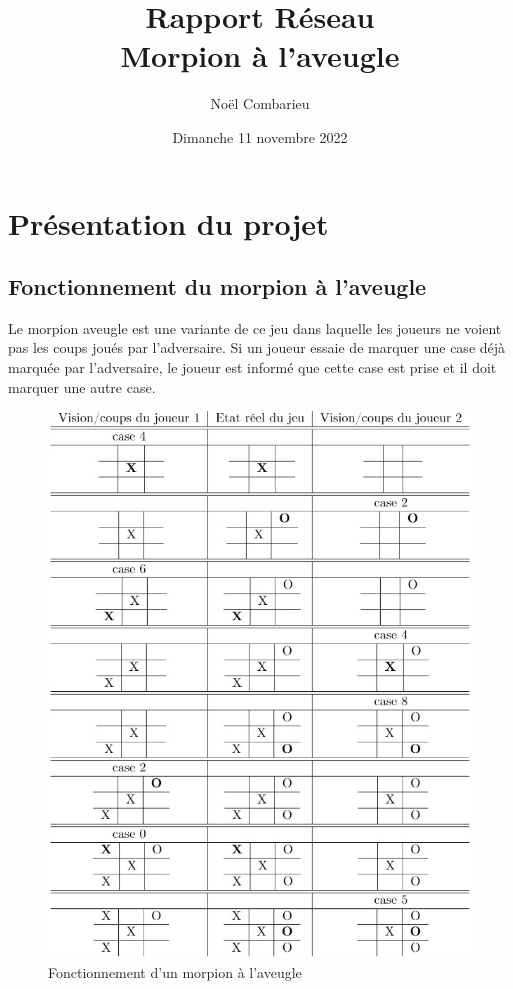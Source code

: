 \documentclass{article}
\title{Rapport Réseau \\
    \large Morpion à l'aveugle
}
\author{Noël Combarieu}
\date{Dimanche 11 novembre 2022}
\begin{document}
\maketitle
\newpage
\section{Présentation du projet}
\subsection{Fonctionnement du morpion à l'aveugle}
Le morpion aveugle est une variante de ce jeu dans laquelle les joueurs ne voient pas les coups joués
par l’adversaire. Si un joueur essaie de marquer une case déjà marquée par l’adversaire, le joueur est
informé que cette case est prise et il doit marquer une autre case. \\

\begin{center}
    \begin{figure}[H]
        \begin{center}
            \includegraphics[scale=0.8]{Morpion_aveugle.jpg}
            \caption{Fonctionnement d'un morpion à l'aveugle}
            \label{Pres}
        \end{center}
    \end{figure}
\end{center}
\end{document}
